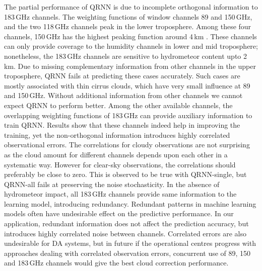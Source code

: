 \documentclass[amt, manuscript]{copernicus}
\begin{document}
The partial performance of QRNN is due to incomplete orthogonal information to 183\,GHz channels. The weighting functions of window channels 89 and 150\,GHz, and the two 118\,GHz channels peak in the lower troposphere. Among these four channels, 150\,GHz has the highest peaking function around 4\,km \citep{chen2020mwhs}. These channels can only provide coverage to the humidity channels in lower and mid troposphere; nonetheless, the 183\,GHz channels are sensitive to hydrometeor content upto 2\,km. Due to missing complementary information from other channels in the upper troposphere, QRNN fails at predicting these cases accurately. Such cases are mostly associated with thin cirrus clouds, which have very small influence at 89 and 150\,GHz. Without additional information from other channels we cannot expect QRNN to perform better. Among the other available channels, the overlapping weighting functions of 183\,GHz can provide auxiliary information to train QRNN. Results show that these channels indeed help in improving the training, yet the non-orthogonal information introduces highly correlated observational errors. The correlations for cloudy observations are not surprising as the cloud amount for different channels depends upon each other in a systematic way. However for clear-sky observations, the correlations should preferably be close to zero. This is observed to be true with QRNN-single, but QRNN-all fails at preserving the noise stochasticity. In the absence of hydrometeor impact, all 183\,GHz channels provide same information to the learning model, introducing redundancy. Redundant patterns in machine learning models often have undesirable effect on the predictive performance. In our application, redundant information does not affect the prediction accuracy, but introduces highly correlated noise between channels. Correlated errors are also undesirable for DA systems, but in future if the operational centres progress with approaches dealing with correlated observation errors, concurrent use of 89, 150 and 183\,GHz channels would give the best cloud correction performance.
\end{document}
